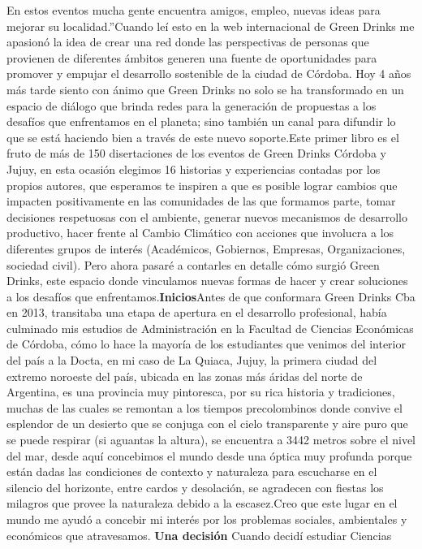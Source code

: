 \begin{fullwidth}
En estos eventos mucha gente encuentra amigos, empleo, nuevas ideas para
mejorar su localidad.''Cuando leí esto en la web internacional de Green
Drinks me apasionó la idea de crear una red donde las perspectivas de
personas que provienen de diferentes ámbitos generen una fuente de
oportunidades para promover y empujar el desarrollo sostenible de la
ciudad de Córdoba. Hoy 4 años más tarde siento con ánimo que Green
Drinks no solo se ha transformado en un espacio de diálogo que brinda
redes para la generación de propuestas a los desafíos que enfrentamos en
el planeta; sino también un canal para difundir lo que se está haciendo
bien a través de este nuevo soporte.Este primer libro es el fruto de más
de 150 disertaciones de los eventos de Green Drinks Córdoba y Jujuy, en
esta ocasión elegimos 16 historias y experiencias contadas por los
propios autores, que esperamos te inspiren a que es posible lograr
cambios que impacten positivamente en las comunidades de las que
formamos parte, tomar decisiones respetuosas con el ambiente, generar
nuevos mecanismos de desarrollo productivo, hacer frente al Cambio
Climático con acciones que involucra a los diferentes grupos de interés
(Académicos, Gobiernos, Empresas, Organizaciones, sociedad civil). Pero
ahora pasaré a contarles en detalle cómo surgió Green Drinks, este
espacio donde vinculamos nuevas formas de hacer y crear soluciones a los
desafíos que enfrentamos.\textbf{Inicios}Antes de que conformara Green
Drinks Cba en 2013, transitaba una etapa de apertura en el desarrollo
profesional, había culminado mis estudios de Administración en la
Facultad de Ciencias Económicas de Córdoba, cómo lo hace la mayoría de
los estudiantes que venimos del interior del país a la Docta, en mi caso
de La Quiaca, Jujuy, la primera ciudad del extremo noroeste del país,
ubicada en las zonas más áridas del norte de Argentina, es una provincia
muy pintoresca, por su rica historia y tradiciones, muchas de las cuales
se remontan a los tiempos precolombinos donde convive el esplendor de un
desierto que se conjuga con el cielo transparente y aire puro que se
puede respirar (si aguantas la altura), se encuentra a 3442 metros sobre
el nivel del mar, desde aquí concebimos el mundo desde una óptica muy
profunda porque están dadas las condiciones de contexto y naturaleza
para escucharse en el silencio del horizonte, entre cardos y desolación,
se agradecen con fiestas los milagros que provee la naturaleza debido a
la escasez.Creo que este lugar en el mundo me ayudó a concebir mi
interés por los problemas sociales, ambientales y económicos que
atravesamos. \textbf{Una decisión} Cuando decidí estudiar Ciencias

\end{fullwidth}
